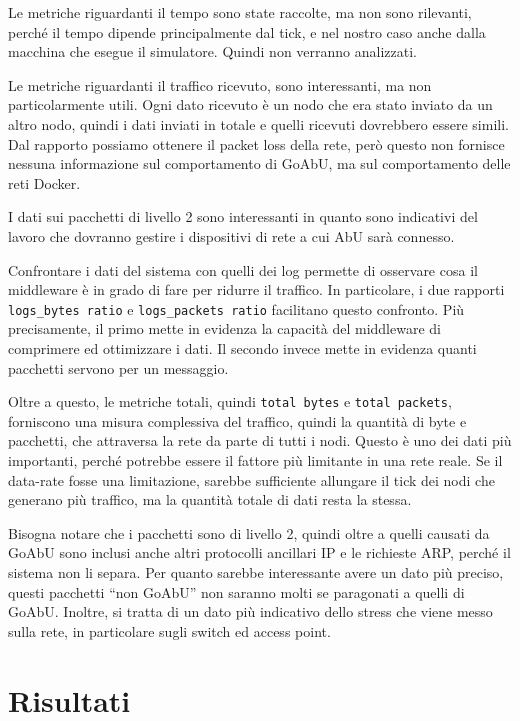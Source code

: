\documentclass[target=bach]{thud}
\begin{document}
Le metriche riguardanti il tempo sono state raccolte, ma non sono rilevanti, perché il tempo dipende principalmente dal tick, e nel nostro caso anche dalla macchina che esegue il simulatore. Quindi non verranno analizzati.

Le metriche riguardanti il traffico ricevuto, sono interessanti, ma non particolarmente utili. Ogni dato ricevuto è un nodo che era stato inviato da un altro nodo, quindi i dati inviati in totale e quelli ricevuti dovrebbero essere simili.
Dal rapporto possiamo ottenere il packet loss della rete, però questo non fornisce nessuna informazione sul comportamento di GoAbU, ma sul comportamento delle reti Docker.

I dati sui pacchetti di livello 2 sono interessanti in quanto sono indicativi del lavoro che dovranno gestire i dispositivi di rete a cui AbU sarà connesso.

Confrontare i dati del sistema con quelli dei log permette di osservare cosa il middleware è in grado di fare per ridurre il traffico. In particolare, i due rapporti \lstinline{logs_bytes ratio} e \lstinline{logs_packets ratio} facilitano questo confronto.
Più precisamente, il primo mette in evidenza la capacità del middleware di comprimere ed ottimizzare i dati.
Il secondo invece mette in evidenza quanti pacchetti servono per un messaggio.

Oltre a questo, le metriche totali, quindi \lstinline{total bytes} e \lstinline{total packets}, forniscono una misura complessiva del traffico, quindi la quantità di byte e pacchetti, che attraversa la rete da parte di tutti i nodi.
Questo è uno dei dati più importanti, perché potrebbe essere il fattore più limitante in una rete reale. Se il data-rate fosse una limitazione, sarebbe sufficiente allungare il tick dei nodi che generano più traffico, ma la quantità totale di dati resta la stessa.

Bisogna notare che i pacchetti sono di livello 2, quindi oltre a quelli causati da GoAbU sono inclusi anche altri protocolli ancillari IP e le richieste ARP, perché il sistema non li separa.
Per quanto sarebbe interessante avere un dato più preciso, questi pacchetti ``non GoAbU'' non saranno molti se paragonati a quelli di GoAbU. Inoltre, si tratta di un dato più indicativo dello stress che viene messo sulla rete, in particolare sugli switch ed access point.

\chapter{Risultati}\label{risultati}
\end{document}
